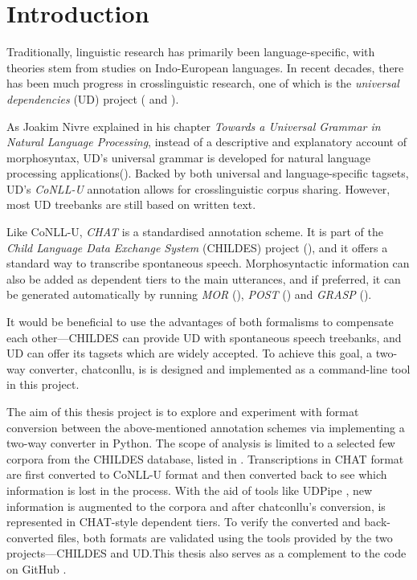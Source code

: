 \chapter{Introduction} %

\label{Chapter1} %

Traditionally, linguistic research has primarily been language-specific, with theories stem from studies on Indo-European languages. In recent decades, there has been much progress in crosslinguistic research, one of which is the \emph{universal dependencies} (UD) project (\cite{nivre2016} and \cite{nivre2020}).

As Joakim Nivre explained in his chapter \emph{Towards a Universal Grammar in Natural Language Processing}, instead of a descriptive and explanatory account of morphosyntax, UD's universal grammar is developed for natural language processing applications(\cite{nivre2015}). Backed by both universal and language-specific tagsets, UD's \emph{CoNLL-U} annotation allows for crosslinguistic corpus sharing. However, most UD treebanks are still based on written text.

Like CoNLL-U, \emph{CHAT} is a standardised annotation scheme. It is part of the \emph{Child Language Data Exchange System} (CHILDES) project (\cite{Macwhinney2000}), and it offers a standard way to transcribe spontaneous speech. Morphosyntactic information can also be added as dependent tiers to the main utterances, and if preferred, it can be generated automatically by running \emph{MOR} (\cite{Macwhinney2000}), \emph{POST} (\cite{parisse2000}) and \emph{GRASP} (\cite{Sagae2004}).

It would be beneficial to use the advantages of both formalisms to compensate each other---CHILDES can provide UD with spontaneous speech treebanks, and UD can offer its tagsets which are widely accepted. To achieve this goal, a two-way converter, chatconllu, is is designed and implemented as a command-line tool in this project.

The aim of this thesis project is to explore and experiment with format conversion between the above-mentioned annotation schemes via implementing a two-way converter in Python. The scope of analysis is limited to a selected few corpora from the CHILDES database, listed in . Transcriptions in CHAT format are first converted to CoNLL-U format and then converted back to see which information is lost in the process. With the aid of tools like UDPipe \cite{straka-etal-2016-udpipe}, new information is augmented to the corpora and after chatconllu's conversion, is represented in CHAT-style dependent tiers. To verify the converted and back-converted files, both formats are validated using the tools provided by the two projects---CHILDES and UD.This thesis also serves as a complement to the code on GitHub .

